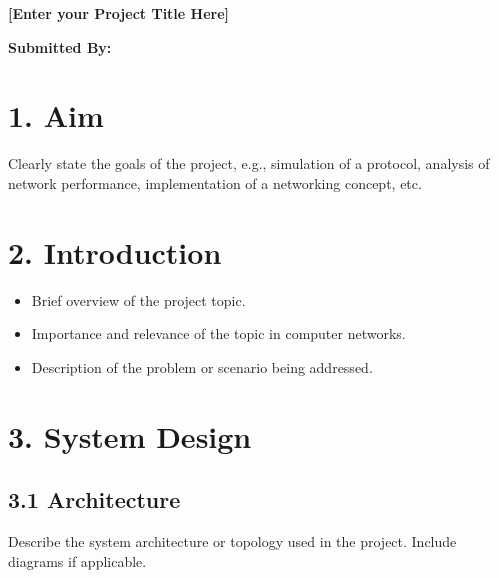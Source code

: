 \documentclass[a4paper,12pt]{article}
\begin{document}
\begin{titlepage}
    \begin{center}
        \vspace*{1cm}
        
        \Huge
        \textbf{[Enter your Project Title Here]}
        
        \vspace{1.5cm}
        \Large
        \textbf{Submitted By:}\\
        [Student Name, Roll Number]
        
        
    \end{center}
\end{titlepage}

\section*{1. Aim}
Clearly state the goals of the project, e.g., simulation of a protocol, analysis of network performance, implementation of a networking concept, etc.

\section*{2. Introduction}
\begin{itemize}
    \item Brief overview of the project topic.
    \item Importance and relevance of the topic in computer networks.
    \item Description of the problem or scenario being addressed.
\end{itemize}

\section*{3. System Design}
\subsection*{3.1 Architecture}
Describe the system architecture or topology used in the project. Include diagrams if applicable.
\end{document}
